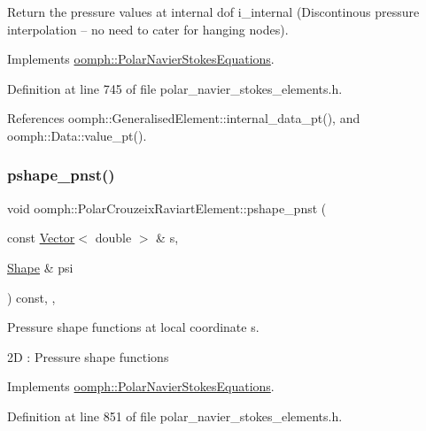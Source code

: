 Return the pressure values at internal dof i\+\_\+internal (Discontinous pressure interpolation -- no need to cater for hanging nodes). 



Implements \hyperlink{classoomph_1_1PolarNavierStokesEquations_a4db8f8149fe830b204de3c5f64fd3113}{oomph\+::\+Polar\+Navier\+Stokes\+Equations}.



Definition at line 745 of file polar\+\_\+navier\+\_\+stokes\+\_\+elements.\+h.



References oomph\+::\+Generalised\+Element\+::internal\+\_\+data\+\_\+pt(), and oomph\+::\+Data\+::value\+\_\+pt().

\mbox{\label{classoomph_1_1PolarCrouzeixRaviartElement_a1898936dd70065cb4054d1e1ba6a9d49}} 
\subsubsection{\texorpdfstring{pshape\+\_\+pnst()}{pshape\_pnst()}\hspace{0.1cm}{\footnotesize\ttfamily [1/2]}}
{\footnotesize\ttfamily void oomph\+::\+Polar\+Crouzeix\+Raviart\+Element\+::pshape\+\_\+pnst (\begin{DoxyParamCaption}\item[{const \hyperlink{classoomph_1_1Vector}{Vector}$<$ double $>$ \&}]{s,  }\item[{\hyperlink{classoomph_1_1Shape}{Shape} \&}]{psi }\end{DoxyParamCaption}) const\hspace{0.3cm}{\ttfamily [inline]}, {\ttfamily [protected]}, {\ttfamily [virtual]}}



Pressure shape functions at local coordinate s. 

2D \+: Pressure shape functions 

Implements \hyperlink{classoomph_1_1PolarNavierStokesEquations_a1b382bf38d7b7041417bbc91ad85b38f}{oomph\+::\+Polar\+Navier\+Stokes\+Equations}.



Definition at line 851 of file polar\+\_\+navier\+\_\+stokes\+\_\+elements.\+h.

